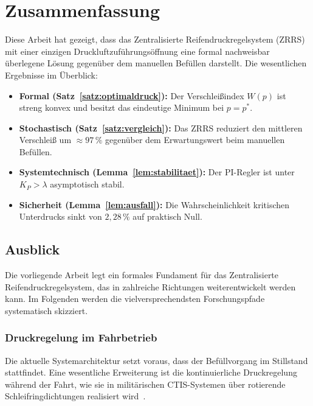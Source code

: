 ﻿\documentclass[a4paper,12pt]{article}
\theoremstyle{definition}
\begin{document}
\section{Zusammenfassung}

Diese Arbeit hat gezeigt, dass das Zentralisierte Reifendruckregelsystem (ZRRS)
mit einer einzigen Druckluftzuführungsöffnung eine formal nachweisbar überlegene
Lösung gegenüber dem manuellen Befüllen darstellt. Die wesentlichen Ergebnisse
im Überblick:

\begin{itemize}
    \item \textbf{Formal (Satz~\ref{satz:optimaldruck}):} Der Verschleißindex
    $W(p)$ ist streng konvex und besitzt das eindeutige Minimum bei $p = p^*$.

    \item \textbf{Stochastisch (Satz~\ref{satz:vergleich}):} Das ZRRS reduziert
    den mittleren Verschleiß um $\approx 97\,\%$ gegenüber dem Erwartungswert
    beim manuellen Befüllen.

    \item \textbf{Systemtechnisch (Lemma~\ref{lem:stabilitaet}):} Der PI-Regler
    ist unter $K_P > \lambda$ asymptotisch stabil.

    \item \textbf{Sicherheit (Lemma~\ref{lem:ausfall}):} Die Wahrscheinlichkeit
    kritischen Unterdrucks sinkt von $2{,}28\,\%$ auf praktisch Null.
\end{itemize}

\subsection{Ausblick}

Die vorliegende Arbeit legt ein formales Fundament für das Zentralisierte
Reifendruckregelsystem, das in zahlreiche Richtungen weiterentwickelt werden
kann. Im Folgenden werden die vielversprechendsten Forschungspfade systematisch
skizziert.

\subsubsection{Druckregelung im Fahrbetrieb}

Die aktuelle Systemarchitektur setzt voraus, dass der Befüllvorgang im
Stillstand stattfindet. Eine wesentliche Erweiterung ist die kontinuierliche
Druckregelung während der Fahrt, wie sie in militärischen CTIS-Systemen
über rotierende Schleifringdichtungen realisiert wird~\cite{ctis_milspec}.
\end{document}
